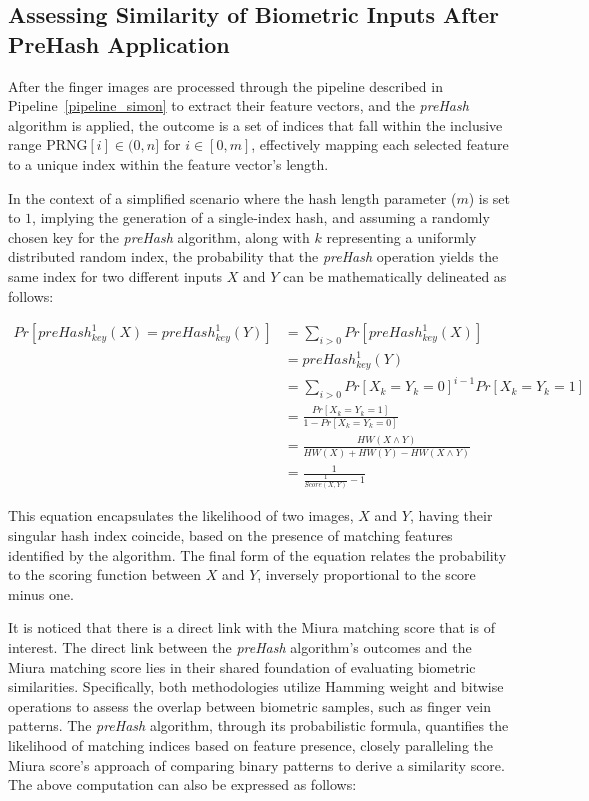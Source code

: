 \subsection{Assessing Similarity of Biometric Inputs After PreHash Application}
\label{sec:mu}

After the finger images are processed through the pipeline described in Pipeline~\ref{pipeline_simon} to extract their feature vectors, and the \textit{preHash} algorithm is applied, the outcome is a set of indices that fall within the inclusive range \(\text{PRNG}[i] \in (0, n] \text{ for } i \in [0, m]\), effectively mapping each selected feature to a unique index within the feature vector's length.

In the context of a simplified scenario where the hash length parameter (\(m\)) is set to \(1\), implying the generation of a single-index hash, and assuming a randomly chosen key for the \textit{preHash} algorithm, along with \(k\) representing a uniformly distributed random index, the probability that the \textit{preHash} operation yields the same index for two different inputs \(X\) and \(Y\) can be mathematically delineated as follows:

\begin{equation} \label{eq:preHash1}
    \begin{aligned}
        Pr[preHash_{key}^1(X) = preHash_{key}^1(Y)] &= \sum_{i > 0} Pr[preHash_{key}^1(X)]\\
        &= preHash_{key}^1(Y)\\
        &= \sum_{i > 0} Pr[X_k = Y_k = 0]^{i - 1} Pr[X_k = Y_k = 1]\\
        &= \frac{Pr[X_k = Y_k = 1]}{1 - Pr[X_k = Y_k = 0]}\\
        &= \frac{HW(X \land Y)}{HW(X) + HW(Y) - HW(X \land Y)}\\
        &= \frac{1}{\frac{1}{Score(X, Y)} - 1}
    \end{aligned}
\end{equation}

This equation encapsulates the likelihood of two images, \(X\) and \(Y\), having their singular hash index coincide, based on the presence of matching features identified by the algorithm. The final form of the equation relates the probability to the scoring function between \(X\) and \(Y\), inversely proportional to the score minus one.

It is noticed that there is a direct link with the Miura matching score that is of interest. The direct link between the \textit{preHash} algorithm's outcomes and the Miura matching score lies in their shared foundation of evaluating biometric similarities. Specifically, both methodologies utilize Hamming weight and bitwise operations to assess the overlap between biometric samples, such as finger vein patterns. The \textit{preHash} algorithm, through its probabilistic formula, quantifies the likelihood of matching indices based on feature presence, closely paralleling the Miura score's approach of comparing binary patterns to derive a similarity score. The above computation can also be expressed as follows:

